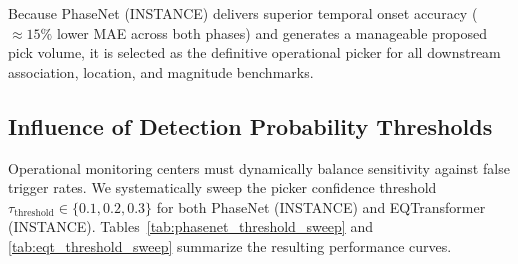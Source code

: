 Because PhaseNet (INSTANCE) delivers superior temporal onset accuracy ($\approx 15\%$ lower MAE across both phases) and generates a manageable proposed pick volume, it is selected as the definitive operational picker for all downstream association, location, and magnitude benchmarks.

\subsection{Influence of Detection Probability Thresholds}
\label{subsec:picker_thresholds}

Operational monitoring centers must dynamically balance sensitivity against false trigger rates. We systematically sweep the picker confidence threshold $\tau_{\mathrm{threshold}} \in \{0.1, 0.2, 0.3\}$ for both PhaseNet (INSTANCE) and EQTransformer (INSTANCE). Tables~\ref{tab:phasenet_threshold_sweep} and \ref{tab:eqt_threshold_sweep} summarize the resulting performance curves.

